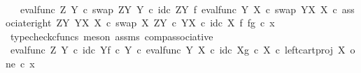 \begin{isabellebody}
\ \ \ \ \isamarkupfalse%
\ \isamarkupfalse%
\ {\isachardoublequoteopen}{\isachardot}{\kern0pt}{\isachardot}{\kern0pt}{\isachardot}{\kern0pt}\ {\isacharequal}{\kern0pt}\ {\isacharparenleft}{\kern0pt}{\isacharparenleft}{\kern0pt}eval{\isacharunderscore}{\kern0pt}func\ Z\ Y\ {\isasymcirc}\isactrlsub c\ swap\ {\isacharparenleft}{\kern0pt}Z\isactrlbsup Y\isactrlesup {\isacharparenright}{\kern0pt}\ Y\ {\isasymcirc}\isactrlsub c\ {\isacharparenleft}{\kern0pt}id\isactrlsub c\ {\isacharparenleft}{\kern0pt}Z\isactrlbsup Y\isactrlesup {\isacharparenright}{\kern0pt}\ {\isasymtimes}\isactrlsub f\ eval{\isacharunderscore}{\kern0pt}func\ Y\ X\ {\isasymcirc}\isactrlsub c\ swap\ {\isacharparenleft}{\kern0pt}Y\isactrlbsup X\isactrlesup {\isacharparenright}{\kern0pt}\ X{\isacharparenright}{\kern0pt}\ {\isasymcirc}\isactrlsub c\ associate{\isacharunderscore}{\kern0pt}right\ {\isacharparenleft}{\kern0pt}Z\isactrlbsup Y\isactrlesup {\isacharparenright}{\kern0pt}\ {\isacharparenleft}{\kern0pt}Y\isactrlbsup X\isactrlesup {\isacharparenright}{\kern0pt}\ X\ {\isasymcirc}\isactrlsub c\ swap\ X\ {\isacharparenleft}{\kern0pt}Z\isactrlbsup Y\isactrlesup \ {\isasymtimes}\isactrlsub c\ Y\isactrlbsup X\isactrlesup {\isacharparenright}{\kern0pt}{\isacharparenright}{\kern0pt}\ {\isasymcirc}\isactrlsub c\ id\isactrlsub c\ X\ {\isasymtimes}\isactrlsub f\ {\isasymlangle}f{\isacharcomma}{\kern0pt}g{\isasymrangle}{\isacharparenright}{\kern0pt}\ {\isasymcirc}\isactrlsub c\ x{}{\isachardoublequoteclose}\isanewline
\ \ \ \ \ \ \isamarkupfalse%
\ {\isacharparenleft}{\kern0pt}typecheck{\isacharunderscore}{\kern0pt}cfuncs{\isacharcomma}{\kern0pt}\ meson\ assms\ comp{\isacharunderscore}{\kern0pt}associative{}{\isacharparenright}{\kern0pt}\isanewline
\ \ \ \ \isamarkupfalse%
\ \isamarkupfalse%
\ {\isachardoublequoteopen}{\isacharparenleft}{\kern0pt}{\isacharparenleft}{\kern0pt}{\isacharparenleft}{\kern0pt}eval{\isacharunderscore}{\kern0pt}func\ Z\ Y\ {\isasymcirc}\isactrlsub c\ {\isasymlangle}id\isactrlsub c\ Y{\isacharcomma}{\kern0pt}f\ {\isasymcirc}\isactrlsub c\ {\isasymbeta}\isactrlbsub Y\isactrlesub {\isasymrangle}{\isacharparenright}{\kern0pt}\ {\isasymcirc}\isactrlsub c\ eval{\isacharunderscore}{\kern0pt}func\ Y\ X\ {\isasymcirc}\isactrlsub c\ {\isasymlangle}id\isactrlsub c\ X{\isacharcomma}{\kern0pt}g\ {\isasymcirc}\isactrlsub c\ {\isasymbeta}\isactrlbsub X\isactrlesub {\isasymrangle}{\isacharparenright}{\kern0pt}\ {\isasymcirc}\isactrlsub c\ left{\isacharunderscore}{\kern0pt}cart{\isacharunderscore}{\kern0pt}proj\ X\ one{\isacharparenright}{\kern0pt}\ {\isasymcirc}\isactrlsub c\ x{}\ {\isacharequal}{\kern0pt}\isanewline

\end{isabellebody}
